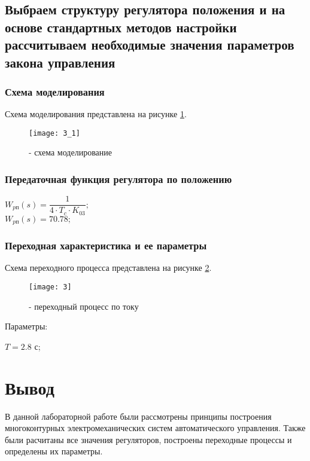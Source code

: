 \newpage

\subsection{Выбраем структуру регулятора положения и на основе стандартных методов настройки рассчитываем необходимые значения параметров закона управления}

\subsubsection{Схема моделирования}
Схема моделирования представлена на рисунке \ref{pic:pic_5}.
\begin{figure}[H]
	\begin{center}
		\texttt{[image: 3\_1]}
		\caption{- схема моделирование} 
		\label{pic:pic_5} %
	\end{center}
\end{figure}

\subsubsection{Передаточная функция регулятора по положению}
\begin{center}
	$W_{p\text{п}}(s)=\dfrac{1}{4\cdot T_c \cdot K_{03}};$\\
	$W_{p\text{п}}(s)=70.78;$\\
\end{center}

\newpage

\subsubsection{Переходная характеристика и ее параметры}
Схема переходного процесса представлена на рисунке \ref{pic:pic_6}.
\begin{figure}[H]
	\begin{center}
		\texttt{[image: 3]}
		\caption{- переходный процесс по току} 
		\label{pic:pic_6} %
	\end{center}
\end{figure}

Параметры:
\begin{center}
	$T = 2.8 \text{ с}$;\\
\end{center}

\section{Вывод}
В данной лабораторной работе были рассмотрены принципы построения многоконтурных электромеханических систем автоматического управления. Также были расчитаны все значения регуляторов, построены переходные процессы и определены их параметры.
